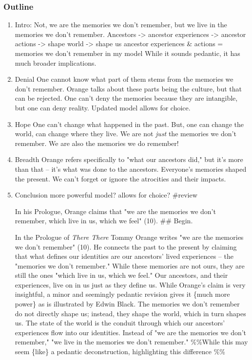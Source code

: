 \documentclass[letterpaper]{article}
\begin{document}
\subsubsection{Outline}
\label{sec:org6d416ee}
\begin{enumerate}
\item Intro:
\label{sec:org2816d61}
Not, we are the memories we don't remember, but we live in the memories
we don't remember. Ancestors -> ancestor experiences -> ancestor actions
-> shape world -> shape us ancestor experiences \& actions = memories we
don't remember in my model While it sounds pedantic, it has much broader
implications.

\item Denial
\label{sec:org6eda2f0}
One cannot know what part of them stems from the memories we don't
remember. Orange talks about these parts being the culture, but that can
be rejected. One can't deny the memories because they are intangible,
but one can deny reality. Updated model allows for choice.

\item Hope
\label{sec:orgc1e1595}
One can't change what happened in the past. But, one can change the
world, can change where they live. We are not \emph{just} the memories we
don't remember. We are also the memories we do remember!

\item Breadth
\label{sec:orgab4b8c5}
Orange refers specifically to "what our ancestors did," but it's more
than that -- it's what was done to the ancestors. Everyone's memories
shaped the present. We can't forget or ignore the atrocities and their
impacts.

\item Conclusion
\label{sec:org3039507}
more powerful model? allows for choice? \#review

In his Prologue, Orange claims that "we are the memories we don't
remember, which live in us, which we feel" (10). \#\# Begin.

In the Prologue of \emph{There There} Tommy Orange writes "we are the
memories we don't remember" (10). He connects the past to the present by
claiming that what defines our identities are our ancestors' lived
experiences -- the "memories we don't remember." While these memories
are not ours, they are still the ones "which live in us, which we feel."
Our ancestors, and their experiences, live on in us just as they define
us. While Orange's claim is very insightful, a minor and seemingly
pedantic revision gives it \{much more power\} as is illustrated by Edwin
Black. The memories we don't remember do not directly shape us; instead,
they shape the world, which in turn shapes us. The state of the world is
the conduit through which our ancestors' experiences flow into our
identities. Instead of "we are the memories we don't remember," "we live
in the memories we don't remember." \%\%While this may seem \{like\} a
pedantic deconstruction, highlighting this difference \%\%


\end{enumerate}
\end{document}
